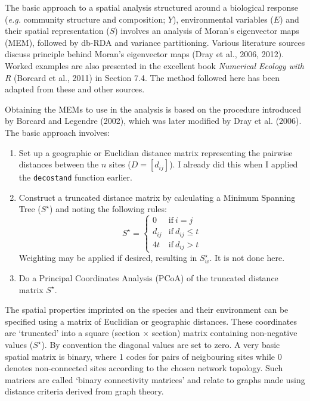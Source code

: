 \documentclass[10pt,A4,]{article}
\begin{document}
The basic approach to a spatial analysis structured around a biological
response (\emph{e.g.} community structure and composition; \(Y\)),
environmental variables (\(E\)) and their spatial representation (\(S\))
involves an analysis of Moran's eigenvector maps (MEM), followed by
db-RDA and variance partitioning. Various literature sources discuss
principle behind Moran's eigenvector maps (Dray et al., 2006, 2012).
Worked examples are also presented in the excellent book \emph{Numerical
Ecology with R} (Borcard et al., 2011) in Section 7.4. The method
followed here has been adapted from these and other sources.

Obtaining the MEMs to use in the analysis is based on the procedure
introduced by Borcard and Legendre (2002), which was later modified by
Dray et al. (2006). The basic approach involves:

\begin{enumerate}
\def\labelenumi{\arabic{enumi}.}
\item
  Set up a geographic or Euclidian distance matrix representing the
  pairwise distances between the \(n\) sites (\(D=[d_{ij}]\)). I already
  did this when I applied the \texttt{decostand} function earlier.
\item
  Construct a truncated distance matrix by calculating a Minimum
  Spanning Tree (\(S^{\star}\)) and noting the following rules:
  \[S^{\star} =\left\{ \begin{array}{rl} 0 & \mbox{if}~i = j \\ d_{ij} & \mbox{if}~d_{ij} \leq t \\ 4t & \mbox{if}~d_{ij} > t \end{array} \right.\]
  Weighting may be applied if desired, resulting in \(S^{\star}_w\). It
  is not done here.
\item
  Do a Principal Coordinates Analysis (PCoA) of the truncated distance
  matrix \(S^{\star}\).
\end{enumerate}

The spatial properties imprinted on the species and their environment
can be specified using a matrix of Euclidian or geographic distances.
These coordinates are `truncated' into a square (section \(\times\)
section) matrix containing non-negative values (\(S^{\star}\)). By
convention the diagonal values are set to zero. A very basic spatial
matrix is binary, where 1 codes for pairs of neigbouring sites while 0
denotes non-connected sites according to the chosen network topology.
Such matrices are called `binary connectivity matrices' and relate to
graphs made using distance criteria derived from graph theory.
\end{document}
